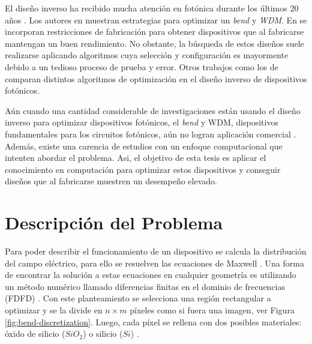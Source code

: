 El diseño inverso ha recibido mucha atención en fotónica durante los últimos 20 años \citep{Molesky2018}. 
Los autores en \cite{Su2020} muestran estrategias para optimizar un \emph{bend} y \emph{WDM}.
En \cite{Su2018, Piggott2017} se incorporan restricciones de fabricación para obtener dispositivos que al fabricarse mantengan un buen rendimiento. 
No obstante, la búsqueda de estos diseños suele realizarse aplicando algoritmos cuya selección y configuración es mayormente debido a un tedioso proceso de prueba y error.
Otros trabajos como los de \cite{Schneider2019, Elsawy2020, Gregory2015} comparan distintos algoritmos de optimización en el diseño inverso de dispositivos fotónicos.


Aún cuando una cantidad considerable de investigaciones están usando el diseño inverso para optimizar dispositivos fotónicos, el \emph{bend} y WDM, dispositivos fundamentales para los circuitos fotónicos, aún no logran aplicación comercial \citep{Molesky2018}.
Además, existe una carencia de estudios con un enfoque computacional que intenten abordar el problema.
Asi, el objetivo de esta tesis es aplicar el conocimiento en computación para optimizar estos dispositivos y conseguir diseños que al fabricarse muestren un desempeño elevado.


\section{Descripción del Problema}


Para poder describir el funcionamiento de un dispositivo se calcula la distribución del campo eléctrico, para ello se resuelven las ecuaciones
de Maxwell \citep{Schneider2019}. 
Una forma de encontrar la solución a estas ecuaciones en cualquier geometría es utilizando un método numérico llamado diferencias finitas en el dominio de frecuencias (FDFD) \citep{Su2020}.
Con este planteamiento se selecciona una región rectangular a optimizar y se la divide  en $n \times m$  píxeles como si fuera una imagen, ver Figura \ref{fig:bend-discretization}. 
Luego, cada píxel se rellena con dos posibles materiales: óxido de silicio ($SiO_2$) o silicio ($Si$) \citep{Molesky2018}.

